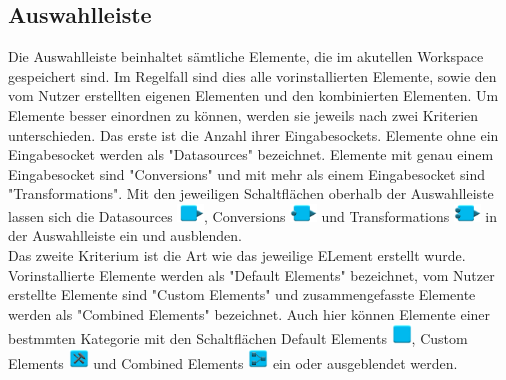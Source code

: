 \subsection{}

\subsection{Auswahlleiste} \label{sub:Auswahlleiste}
Die Auswahlleiste beinhaltet s\"amtliche Elemente, die im akutellen Workspace gespeichert sind. Im Regelfall sind dies alle vorinstallierten Elemente, sowie den vom Nutzer erstellten eigenen Elementen und den kombinierten Elementen. Um Elemente besser einordnen zu k\"onnen, werden sie jeweils nach zwei Kriterien unterschieden.
Das erste ist die Anzahl ihrer Eingabesockets. Elemente ohne ein Eingabesocket werden als "Datasources" bezeichnet. Elemente mit genau einem Eingabesocket sind "Conversions" und mit mehr als einem Eingabesocket sind "Transformations". Mit den jeweiligen Schaltfl\"achen oberhalb der Auswahlleiste lassen sich die Datasources \includegraphics[width = 20pt]{Manual/datasources}, Conversions \includegraphics[width = 20pt]{Manual/conversions} und Transformations \includegraphics[width = 20pt]{Manual/transformations} in der Auswahlleiste ein und ausblenden.
\\
Das zweite Kriterium ist die Art wie das jeweilige ELement erstellt wurde. Vorinstallierte Elemente werden als "Default Elements" bezeichnet, vom Nutzer erstellte Elemente sind "Custom Elements" und zusammengefasste Elemente werden als "Combined Elements" bezeichnet. Auch hier k\"onnen Elemente einer bestmmten Kategorie mit den Schaltfl\"achen Default Elements \includegraphics[width = 15pt]{Manual/default_transf}, Custom Elements \includegraphics[width = 15pt]{Manual/custom_elements} und Combined Elements \includegraphics[width = 15pt]{Manual/combined_transf} ein oder ausgeblendet werden.
